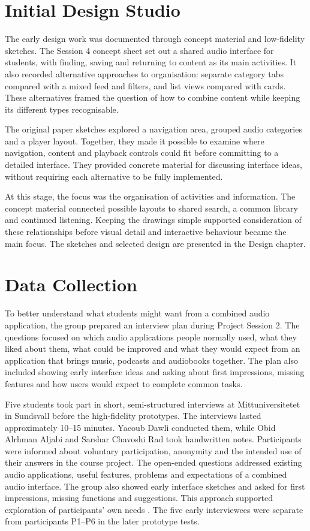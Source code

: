\section{Initial Design Studio}
\label{sec:initial-design-studio}

The early design work was documented through concept material and
low-fidelity sketches. The Session 4 concept sheet set out a shared audio
interface for students, with finding, saving and returning to content as its
main activities. It also recorded alternative approaches to organisation:
separate category tabs compared with a mixed feed and filters, and list
views compared with cards. These alternatives framed the question of how to
combine content while keeping its different types recognisable.

The original paper sketches explored a navigation area, grouped audio
categories and a player layout. Together, they made it possible to examine
where navigation, content and playback controls could fit before committing
to a detailed interface. They provided concrete material for discussing
interface ideas, without requiring each alternative to be fully implemented.

At this stage, the focus was the organisation of activities and information.
The concept material connected possible layouts to shared search, a common
library and continued listening. Keeping the drawings simple supported
consideration of these relationships before visual detail and interactive
behaviour became the main focus. The sketches and selected design are
presented in the Design chapter.

\section{Data Collection}
\label{sec:method-data-collection}

To better understand what students might want from a combined audio application, the group prepared an interview plan during Project Session 2. The questions focused on which audio applications people normally used, what they liked about them, what could be improved and what they would expect from an application that brings music, podcasts and audiobooks together. The plan also included showing early interface ideas and asking about first impressions, missing features and how users would expect to complete common tasks.

Five students took part in short, semi-structured interviews at Mittuniversitetet in Sundsvall before the high-fidelity prototypes. The interviews lasted approximately 10--15 minutes. Yacoub Dawli conducted them, while Obid Alrhman Aljabi and Sarshar Chavoshi Rad took handwritten notes. Participants were informed about voluntary participation, anonymity and the intended use of their answers in the course project. The open-ended questions addressed existing audio applications, useful features, problems and expectations of a combined audio interface. The group also showed early interface sketches and asked for first impressions, missing functions and suggestions. This approach supported exploration of participants' own needs \cite{rosalainterviews}. The five early interviewees were separate from participants P1--P6 in the later prototype tests.

